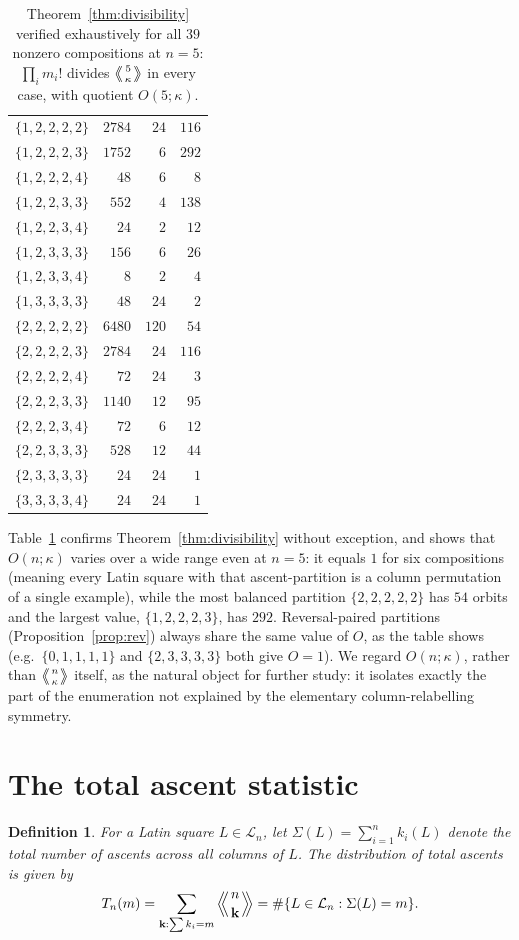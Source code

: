 \documentclass[11pt]{amsart}
\newtheorem{definition}[theorem]{Definition}
\newcommand{\LE}[1]{\left\langle\!\!\left\langle #1 \right\rangle\!\!\right\rangle}
\begin{document}
\begin{table}[h]
\begin{tabular}{@{}l r r r@{}}
$\{1,2,2,2,2\}$ & $2784$ & $24$ & $116$ \\
$\{1,2,2,2,3\}$ & $1752$ & $6$ & $292$ \\
$\{1,2,2,2,4\}$ & $48$ & $6$ & $8$ \\
$\{1,2,2,3,3\}$ & $552$ & $4$ & $138$ \\
$\{1,2,2,3,4\}$ & $24$ & $2$ & $12$ \\
$\{1,2,3,3,3\}$ & $156$ & $6$ & $26$ \\
$\{1,2,3,3,4\}$ & $8$ & $2$ & $4$ \\
$\{1,3,3,3,3\}$ & $48$ & $24$ & $2$ \\
$\{2,2,2,2,2\}$ & $6480$ & $120$ & $54$ \\
$\{2,2,2,2,3\}$ & $2784$ & $24$ & $116$ \\
$\{2,2,2,2,4\}$ & $72$ & $24$ & $3$ \\
$\{2,2,2,3,3\}$ & $1140$ & $12$ & $95$ \\
$\{2,2,2,3,4\}$ & $72$ & $6$ & $12$ \\
$\{2,2,3,3,3\}$ & $528$ & $12$ & $44$ \\
$\{2,3,3,3,3\}$ & $24$ & $24$ & $1$ \\
$\{3,3,3,3,4\}$ & $24$ & $24$ & $1$ \\
\bottomrule
\end{tabular}
\caption{Theorem~\ref{thm:divisibility} verified exhaustively for all $39$ nonzero compositions at $n=5$: $\prod_i m_i!$ divides $\LE{5\atop\kappa}$ in every case, with quotient $O(5;\kappa)$.}
\label{tab:orbits5}
\end{table}

Table~\ref{tab:orbits5} confirms Theorem~\ref{thm:divisibility} without exception, and shows that $O(n;\kappa)$ varies over a wide range even at $n=5$: it equals $1$ for six compositions (meaning every Latin square with that ascent-partition is a column permutation of a single example), while the most balanced partition $\{2,2,2,2,2\}$ has $54$ orbits and the largest value, $\{1,2,2,2,3\}$, has $292$. Reversal-paired partitions (Proposition~\ref{prop:rev}) always share the same value of $O$, as the table shows (e.g.\ $\{0,1,1,1,1\}$ and $\{2,3,3,3,3\}$ both give $O=1$). We regard $O(n;\kappa)$, rather than $\LE{n\atop\kappa}$ itself, as the natural object for further study: it isolates exactly the part of the enumeration not explained by the elementary column-relabelling symmetry.

\section{The total ascent statistic}
\begin{definition}
For a Latin square $L \in \mathcal{L}_n$, let $\Sigma(L) = \sum_{i=1}^n k_i(L)$ denote the total number of ascents across all columns of $L$. The distribution of total ascents is given by
\[
T_n(m) = \sum_{\substack{\mathbf{k} : \sum k_i = m}} \LE{n\atop\mathbf{k}} = \#\{L \in \mathcal{L}_n : \Sigma(L) = m\}.
\]
\end{definition}
\end{document}
